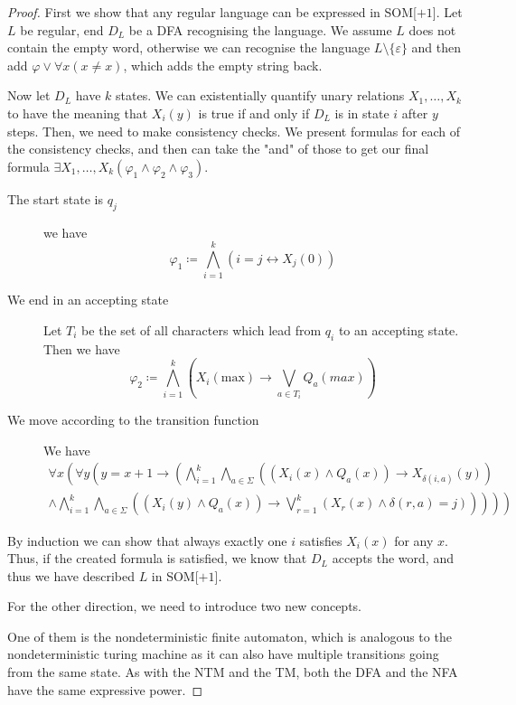 \begin{proof}
    First we show that any regular language can be expressed in SOM[$+1$].
    Let $L$ be regular, end $D_L$ be a DFA recognising the language.
    We assume $L$ does not contain the empty word, otherwise we can recognise the language $L \setminus \{\varepsilon\}$ and then add $\varphi \lor \forall x(x \neq x)$, which adds the empty string back.

    Now let $D_L$ have $k$ states.
    We can existentially quantify unary relations $X_1, \dots, X_k$ to have the meaning that $X_i(y)$ is true if and only if $D_L$ is in state $i$ after $y$ steps.
    Then, we need to make consistency checks.
    We present formulas for each of the consistency checks, and then can take the "and" of those to get our final formula $\exists X_1, \dots, X_k(\varphi_1 \land \varphi_2 \land \varphi_3)$.
    \begin{description}
        \item[The start state is $q_j$] we have \[\varphi_1 \coloneqq \bigwedge_{i = 1}^{k} (i = j \leftrightarrow X_j(0))\]
        \item[We end in an accepting state] Let $T_i$ be the set of all characters which lead from $q_i$ to an accepting state.
        Then we have
        \[
            \varphi_2 \coloneqq \bigwedge_{i = 1}^{k}\left(X_i(\text{max}) \to \bigvee_{a \in T_i} Q_a(max)\right)
        \]
        \item[We move according to the transition function] We have
        \begin{align*}
            \forall x\left( \forall y \left( y = x + 1 \to \left(\bigwedge_{i = 1}^{k} \bigwedge_{a \in \Sigma} \left(\left(X_i(x) \land Q_a(x)\right) \to X_{\delta(i, a)}(y)\right) \right. \right. \right. \\
            \left. \left. \left.\land \bigwedge_{i = 1}^{k}\bigwedge_{a \in \Sigma} \left(\left(X_i(y) \land Q_a(x)\right) \to \bigvee_{r = 1}^{k}\left(X_r(x) \land \delta(r, a) = j\right)\right)  \right)  \right) \right)
        \end{align*}
    \end{description}
    By induction we can show that always exactly one $i$ satisfies $X_i(x)$ for any $x$.
    Thus, if the created formula is satisfied, we know that $D_L$ accepts the word, and thus we have described $L$ in SOM[$+1$].

    For the other direction, we need to introduce two new concepts.

    One of them is the nondeterministic finite automaton, which is analogous to the nondeterministic turing machine as it can also have multiple transitions going from the same state.
    As with the NTM and the TM, both the DFA and the NFA have the same expressive power.


\end{proof}
